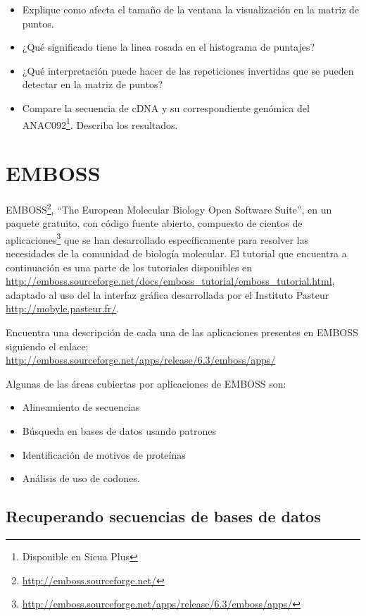 \documentclass[letter,11pt]{book}
\begin{document}
{\color{red}
\begin{itemize}
\item Explique como afecta el tamaño de la ventana la visualización en la matriz de puntos.
\item ¿Qué significado tiene la linea rosada en el histograma de puntajes?
\item ¿Qué interpretación puede hacer de las repeticiones invertidas que se pueden detectar en la matriz de puntos?
\item Compare la secuencia de cDNA y su correspondiente genómica del ANAC092\footnote{Disponible en Sicua Plus}. Describa los resultados.
\end{itemize}
}

\chapter{EMBOSS}

EMBOSS\footnote{\url{http://emboss.sourceforge.net/}},  ``The European Molecular Biology Open Software Suite'', en un paquete gratuito, con código fuente abierto, compuesto de cientos de aplicaciones\footnote{\url{http://emboss.sourceforge.net/apps/release/6.3/emboss/apps/}} que se han desarrollado específicamente para resolver las necesidades de la comunidad de biología molecular.  El tutorial que encuentra a continuación es una parte de los tutoriales disponibles en \url{http://emboss.sourceforge.net/docs/emboss_tutorial/emboss_tutorial.html}, adaptado al uso del la interfaz gráfica desarrollada por el Instituto Pasteur \url{http://mobyle.pasteur.fr/}.

Encuentra una descripción de cada una de las aplicaciones presentes en EMBOSS siguiendo el enlace: \url{http://emboss.sourceforge.net/apps/release/6.3/emboss/apps/}

Algunas de las áreas cubiertas por aplicaciones de EMBOSS son:

\begin{itemize}
\item Alineamiento de secuencias
\item Búsqueda en bases de datos usando patrones
\item Identificación de motivos de proteínas
\item Análisis de uso de codones.
\end{itemize}

\section{Recuperando secuencias de bases de datos}
\end{document}
